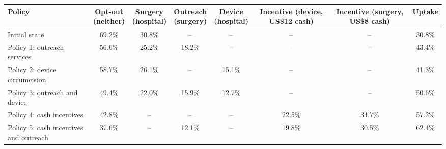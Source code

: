 \begin{tabular}{>{\raggedright\arraybackslash}p{3.4cm}ccccccc}
\toprule
Policy & \makecell{Opt-out\\(neither)} & \makecell{Surgery\\(hospital)} & \makecell{Outreach\\(surgery)} & \makecell{Device\\(hospital)} & \makecell{Incentive\\(device,\\US\$12 cash)} & \makecell{Incentive\\(surgery,\\US\$8 cash)} & Uptake
\\
\midrule
Initial state & 69.2\% & 30.8\% & -- & -- & -- & -- & 30.8\% \\
Policy 1: outreach services & 56.6\% & 25.2\% & 18.2\% & -- & -- & -- & 43.4\% \\
Policy 2: device circumcision & 58.7\% & 26.1\% & -- & 15.1\% & -- & -- & 41.3\% \\
Policy 3: outreach and device & 49.4\% & 22.0\% & 15.9\% & 12.7\% & -- & -- & 50.6\% \\
Policy 4: cash incentives & 42.8\% & -- & -- & -- & 22.5\% & 34.7\% & 57.2\% \\
Policy 5: cash incentives and outreach & 37.6\% & -- & 12.1\% & -- & 19.8\% & 30.5\% & 62.4\% \\
\bottomrule
\end{tabular}
